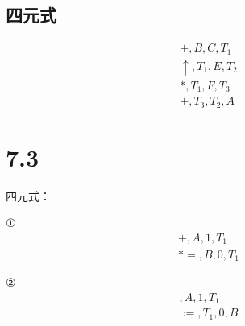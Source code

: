 \documentclass[UTF8]{ctexart}
\begin{document}
\subsection*{四元式}

\begin{align*}
    +, B, C, T_1 \\
    \uparrow, T_1, E, T_2 \\
    *, T_1, F, T_3 \\
    +, T_3, T_2, A 
\end{align*}

\section*{7.3}

四元式：

①
\begin{align*}
    +, A, 1, T_1 \\
    *=, B, 0, T_1
\end{align*}

②
\begin{align*}
    [], A, 1, T_1 \\
    :=, T_1, 0, B
\end{align*}
\end{document}
